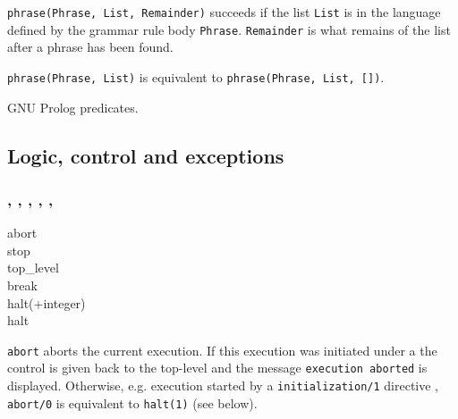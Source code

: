 \Description

\texttt{phrase(Phrase, List, Remainder)} succeeds if the list
\texttt{List} is in the language defined by the grammar rule body
\texttt{Phrase}. \texttt{Remainder} is what remains of the list after a
phrase has been found.

\texttt{phrase(Phrase, List)} is equivalent to
\texttt{phrase(Phrase, List, [])}.

\begin{PlErrors}





\end{PlErrors}

\Portability

GNU Prolog predicates.

\subsection{Logic, control and exceptions}

\subsubsection{,\label{abort/0}
               ,
               ,
               ,
               ,
               }


\begin{TemplatesOneCol}
abort\\
stop\\
top\_level\\
break\\
halt(+integer)\\
halt

\end{TemplatesOneCol}

\Description

\texttt{abort} aborts the current execution. If this execution was initiated
under a  the control is given back to the top-level and the
message \texttt{{\lb}execution aborted{\rb}} is displayed. Otherwise,
e.g. execution started by a \texttt{initialization/1} directive
, \texttt{abort/0} is equivalent to
\texttt{halt(1)} (see below).

